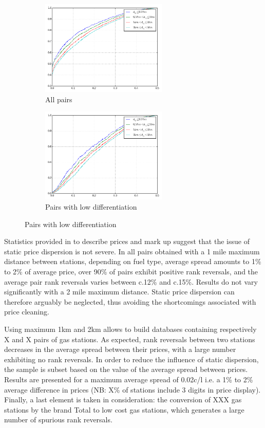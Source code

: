 \documentclass[11pt]{article}
\begin{document}
\begin{figure}[H]
\centering
\caption{Empirical distribution functions of rank reversals (raw prices)}
\begin{subfigure}{.4\linewidth}
\centering
\includegraphics[width=6cm]{graphs/ecdf_rr_all.png}
\caption[short]{All pairs}
\end{subfigure}
\begin{subfigure}{.4\linewidth}
\centering
\includegraphics[width=6cm]{graphs/ecdf_rr_nodiff.png}
\caption[short]{Pairs with low differentiation}
\end{subfigure}
\end{figure}

Statistics provided in \cite{TAP11} to describe prices and mark up suggest that the issue of static price dispersion is not severe. In all pairs obtained with a 1 mile maximum distance between stations, depending on fuel type, average spread amounts to 1\% to 2\% of average price, over 90\% of pairs exhibit positive rank reversals, and the average pair rank reversals varies between c.12\% and c.15\%. Results do not vary significantly with a 2 mile maximum distance. Static price dispersion can therefore arguably be neglected, thus avoiding the shortcomings associated with price cleaning.

Using maximum 1km and 2km allows to build databases containing respectively X and X pairs of gas stations. As expected, rank reversals between two stations decreases in the average spread between their prices, with a large number exhibiting no rank reversals. In order to reduce the influence of static dispersion, the sample is subset based on the value of the average spread between prices. Results are presented for a maximum average spread of 0.02c/l i.e. a 1\% to 2\% average difference in prices (NB: X\% of stations include 3 digits in price display). Finally, a last element is taken in consideration: the conversion of XXX gas stations by the brand Total to low cost gas stations, which generates a large number of spurious rank reversals.
\end{document}

